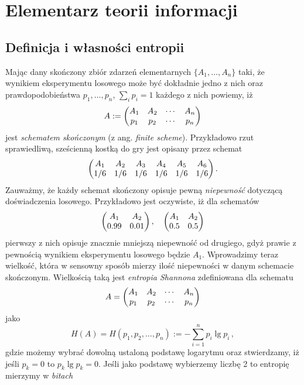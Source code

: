 \documentclass{myclass}
\begin{document}
\section{Elementarz teorii informacji}

\subsection{Definicja i własności entropii}

Mając dany skończony zbiór zdarzeń elementarnych \(\{A_1,\ldots,A_n\}\) taki, że wynikiem
eksperymentu losowego może być dokładnie jedno z nich oraz prawdopodobieństwa \(p_1,\ldots,p_n\),
\(\sum_{i}p_i = 1\) każdego z nich powiemy, iż
\begin{equation*}
    A := \mqty(A_1 & A_2 & \cdots & A_n \\ p_1 & p_2 & \cdots & p_n)
\end{equation*} 
jest \textit{schematem skończonym} (z ang. \textit{finite scheme}). Przykładowo rzut sprawiedliwą,
sześcienną kostką do gry jest opisany przez schemat
\begin{equation*}
    \mqty(A_1 & A_2 & A_3 & A_4 & A_5 & A_6 \\ 1/6 & 1/6 & 1/6 & 1/6 & 1/6 & 1/6) \,.
\end{equation*} 
Zauważmy, że każdy schemat skończony opisuje pewną \textit{niepewność} dotyczącą doświadczenia
losowego. Przykładowo jest oczywiste, iż dla schematów
\begin{equation*}
    \mqty(A_1 & A_2 \\ 0.99 & 0.01)\,,\quad \mqty(A_1 & A_2 \\ 0.5 & 0.5)
\end{equation*}
pierwszy z nich opisuje znacznie mniejszą niepewność od drugiego, gdyż prawie z pewnością wynikiem
eksperymentu losowego będzie \(A_1\). Wprowadzimy teraz wielkość, która w sensowny sposób mierzy
ilość niepewności w danym schemacie skończonym. Wielkością taką jest \textit{entropia Shannona}
zdefiniowana dla schematu
\begin{equation*}
    A = \mqty(A_1 & A_2 & \cdots & A_n \\ p_1 & p_2 & \cdots & p_n)
\end{equation*}
jako
\begin{equation*}
    H(A) = H(p_1,p_2,\ldots,p_n) := -\sum_{i=1}^n p_i\lg p_i\,,
\end{equation*}
gdzie możemy wybrać dowolną ustaloną podstawę logarytmu oraz stwierdzamy, iż jeśli \(p_k = 0\) to
\(p_k \lg p_k = 0\). Jeśli jako podstawę wybierzemy liczbę 2 to entropię mierzymy w \textit{bitach}
\end{document}
